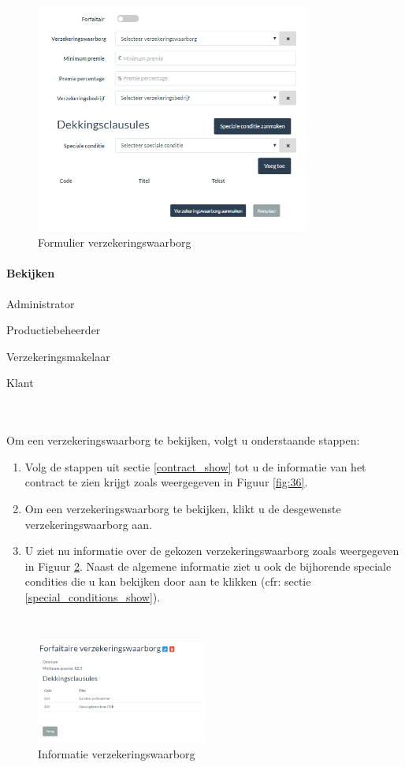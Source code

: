 \documentclass[11pt,openany]{article}
\newcommand{\cmark}{\ding{51}}%
\newcommand{\xmark}{\ding{55}}%
\newcommand{\done}{\rlap{$\square$}{\raisebox{2pt}{\large\hspace{1pt}\cmark}}%
	\hspace{-2.5pt}}
\newcommand{\wontfix}{\rlap{$\square$}{\large\hspace{1pt}\xmark}}
\begin{document}
\begin{figure}
	\centering
	\includegraphics[width=0.8\textwidth]{img/fig39.png}
	\caption{Formulier verzekeringswaarborg} 
	\label{fig:39} 
\end{figure}

\paragraph{Bekijken}
\begin{todolist}
	\item[\done] Administrator
	\item[\done] Productiebeheerder
	\item[\done] Verzekeringsmakelaar
	\item[\wontfix] Klant 
\end{todolist}
\\
\\
Om een verzekeringswaarborg te bekijken, volgt u onderstaande stappen:
\begin{enumerate}
	\item  Volg de stappen uit sectie \ref{contract_show} tot u de informatie van het contract te zien krijgt zoals weergegeven in Figuur \ref{fig:36}.
	\item Om een verzekeringswaarborg te bekijken, klikt u de desgewenste verzekeringswaarborg aan.
	\item U ziet nu informatie over de gekozen verzekeringswaarborg zoals weergegeven in Figuur \ref{fig:40}. 
	Naast de algemene informatie ziet u ook de bijhorende speciale condities die u kan bekijken door aan te klikken (cfr: sectie \ref{special_conditions_show}). 
\end{enumerate}
\
\begin{figure}
	\centering
	\includegraphics[width=0.5\textwidth]{img/fig40.png}
	\caption{Informatie verzekeringswaarborg} 
	\label{fig:40} 
\end{figure}
\end{document}
